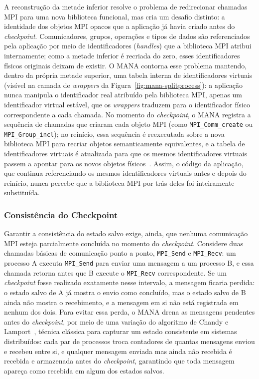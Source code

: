 A reconstrução da metade inferior resolve o problema de redirecionar chamadas MPI
para uma nova biblioteca funcional, mas cria um desafio distinto: a identidade dos
objetos MPI opacos que a aplicação já havia criado antes do \textit{checkpoint}. Comunicadores,
grupos, operações e tipos de dados são referenciados pela aplicação por meio de
identificadores (\textit{handles}) que a biblioteca MPI atribui internamente; como a
metade inferior é recriada do zero, esses identificadores físicos originais deixam de
existir. O MANA contorna esse problema mantendo, dentro da própria metade superior,
uma tabela interna de identificadores virtuais (visível na camada de
\textit{wrappers} da Figura~\ref{fig:mana-splitprocess}): a aplicação nunca manipula o
identificador real atribuído pela biblioteca MPI, apenas um identificador virtual
estável, que os \textit{wrappers} traduzem para o identificador físico correspondente
a cada chamada.
No momento do \textit{checkpoint}, o MANA registra a sequência de chamadas que criaram cada
objeto MPI (como \texttt{MPI\_Comm\_create} ou \texttt{MPI\_Group\_incl}); no
reinício, essa sequência é reexecutada sobre a nova biblioteca MPI para recriar
objetos semanticamente equivalentes, e a tabela de identificadores virtuais é
atualizada para que os mesmos identificadores virtuais passem a apontar para os novos
objetos físicos~\cite{garg2019mana,xu2023mana}. Assim, o código da aplicação, que
continua referenciando os mesmos identificadores virtuais antes e depois do reinício,
nunca percebe que a biblioteca MPI por trás deles foi inteiramente substituída.

\subsubsection{Consistência do Checkpoint}
\label{sec:mana-consistencia}

Garantir a consistência do estado salvo exige, ainda, que nenhuma comunicação MPI
esteja parcialmente concluída no momento do \textit{checkpoint}. Considere duas chamadas
básicas de comunicação ponto a ponto, \texttt{MPI\_Send} e \texttt{MPI\_Recv}: um
processo A executa \texttt{MPI\_Send} para enviar uma mensagem a um processo B, e essa
chamada retorna antes que B execute o \texttt{MPI\_Recv} correspondente. Se um
\textit{checkpoint} fosse realizado exatamente nesse intervalo, a mensagem ficaria perdida: o
estado salvo de A já mostra o envio como concluído, mas o estado salvo de B ainda não
mostra o recebimento, e a mensagem em si não está registrada em nenhum dos dois. Para
evitar essa perda, o MANA drena as mensagens pendentes antes do \textit{checkpoint}, por meio
de uma variação do algoritmo de Chandy e Lamport~\cite{chandy1985snapshots}, técnica
clássica para capturar um estado consistente em sistemas distribuídos: cada par de
processos troca contadores de quantas mensagens enviou e recebeu entre si, e qualquer
mensagem enviada mas ainda não recebida é recebida e armazenada antes do \textit{checkpoint},
garantindo que toda mensagem apareça como recebida em algum dos estados salvos.

